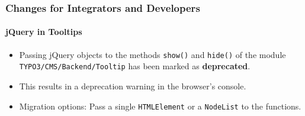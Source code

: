 %

\begin{frame}[fragile]
	\frametitle{Changes for Integrators and Developers}
	\framesubtitle{jQuery in Tooltips}


	\begin{itemize}
		\item Passing jQuery objects to the methods \texttt{show()} and \texttt{hide()}
			of the module \texttt{TYPO3/CMS/Backend/Tooltip} has been marked as
			\textbf{deprecated}.
		\item This results in a deprecation warning in the browser's console.
		\item Migration options:
			Pass a single \texttt{HTMLElement} or a \texttt{NodeList} to the
			functions.
	\end{itemize}

\end{frame}

